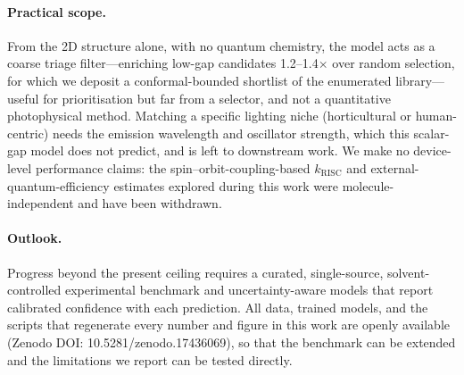 \paragraph{Practical scope.}
From the 2D structure alone, with no quantum chemistry, the model acts as a coarse
triage filter---enriching low-gap candidates \numrange{1.2}{1.4}$\times$ over random
selection, for which we deposit a conformal-bounded shortlist of the enumerated
library---useful for prioritisation but far from a selector, and not a quantitative
photophysical method. Matching a specific lighting niche (horticultural or
human-centric) needs the emission wavelength and oscillator strength, which this
scalar-gap model does not predict, and is left to downstream work.
We make no device-level performance claims: the spin--orbit-coupling-based
$k_\text{RISC}$ and external-quantum-efficiency estimates explored during this work
were molecule-independent and have been withdrawn.

\paragraph{Outlook.}
Progress beyond the present ceiling requires a curated, single-source,
solvent-controlled experimental benchmark and uncertainty-aware models that report
calibrated confidence with each prediction. All data, trained models, and the
scripts that regenerate every number and figure in this work are openly available
(Zenodo DOI: 10.5281/zenodo.17436069), so that the benchmark can be extended and
the limitations we report can be tested directly.
